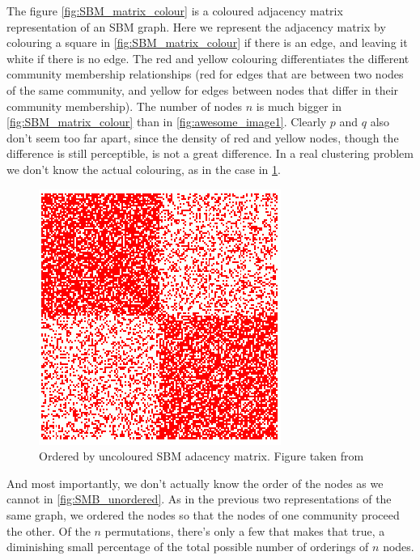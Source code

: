 The figure \ref{fig:SBM_matrix_colour} is a coloured adjacency matrix representation of an SBM graph. Here we represent the adjacency matrix by colouring a square in \ref{fig:SBM_matrix_colour} if there is an edge, and leaving it white if there is no edge.  The red and yellow colouring differentiates the different community membership relationships (red for edges that are between two nodes of the same community, and yellow for edges between nodes that differ in their community membership). The number of nodes $n$ is much bigger in \ref{fig:SBM_matrix_colour} than in \ref{fig:awesome_image1}. Clearly $p$ and $q$ also don't seem too far apart, since the density of red and yellow nodes, though the difference is still perceptible, is not a great difference.  In a real clustering problem we don't know the actual colouring, as in the case in \ref{fig:SMB_uncolored}.

\begin{figure}[h]
\begin{center}
  \includegraphics[scale=0.5]{SMB_uncolored}
  \caption{Ordered by uncoloured SBM adacency matrix.  Figure taken from \cite{SBM_adjacency_talk}}
  \label{fig:SMB_uncolored}
 \end{center}
\end{figure}

And most importantly, we don't actually know the order of the nodes as we cannot in \ref{fig:SMB_unordered}.  As in the previous two representations of the same graph, we ordered the nodes so that the nodes of one community proceed the other.  Of the $n\!$ permutations, there's only a few that makes that true, a diminishing small percentage of the total possible number of orderings of $n$ nodes.  

